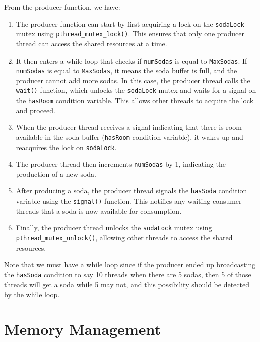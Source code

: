 \documentclass{article}
\newcounter{example}[section]
\begin{document}
\begin{example}
      From the producer function, we have: 

      \begin{enumerate}
        \item The producer function can start by first acquiring a lock on the \texttt{sodaLock} mutex using \texttt{pthread\_mutex\_lock()}. This ensures that only one producer thread can access the shared resources at a time.

        \item It then enters a while loop that checks if \texttt{numSodas} is equal to \texttt{MaxSodas}. If \texttt{numSodas} is equal to \texttt{MaxSodas}, it means the soda buffer is full, and the producer cannot add more sodas. In this case, the producer thread calls the \texttt{wait()} function, which unlocks the \texttt{sodaLock} mutex and waits for a signal on the \texttt{hasRoom} condition variable. This allows other threads to acquire the lock and proceed.

        \item When the producer thread receives a signal indicating that there is room available in the soda buffer (\texttt{hasRoom} condition variable), it wakes up and reacquires the lock on \texttt{sodaLock}.

        \item The producer thread then increments \texttt{numSodas} by 1, indicating the production of a new soda.

        \item After producing a soda, the producer thread signals the \texttt{hasSoda} condition variable using the \texttt{signal()} function. This notifies any waiting consumer threads that a soda is now available for consumption.

        \item Finally, the producer thread unlocks the \texttt{sodaLock} mutex using \texttt{pthread\_mutex\_unlock()}, allowing other threads to access the shared resources.

      \end{enumerate}
      Note that we must have a while loop since if the producer ended up broadcasting the \texttt{hasSoda} condition to say 10 threads when there are 5 sodas, then 5 of those threads will get a soda while 5 may not, and this possibility should be detected by the while loop. 
    \end{example}

\section{Memory Management}
\end{document}

